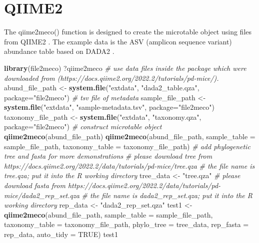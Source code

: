 \documentclass[
]{book}
\newenvironment{Shaded}{\begin{snugshade}}{\end{snugshade}}
\newcommand{\AttributeTok}[1]{\textcolor[rgb]{0.13,0.29,0.53}{#1}}
\newcommand{\CommentTok}[1]{\textcolor[rgb]{0.56,0.35,0.01}{\textit{#1}}}
\newcommand{\ConstantTok}[1]{\textcolor[rgb]{0.56,0.35,0.01}{#1}}
\newcommand{\FunctionTok}[1]{\textcolor[rgb]{0.13,0.29,0.53}{\textbf{#1}}}
\newcommand{\NormalTok}[1]{#1}
\newcommand{\OtherTok}[1]{\textcolor[rgb]{0.56,0.35,0.01}{#1}}
\newcommand{\StringTok}[1]{\textcolor[rgb]{0.31,0.60,0.02}{#1}}
\begin{document}
\section{QIIME2}\label{qiime2}

The qiime2meco() function is designed to create the microtable object using files from QIIME2 \citep{Bolyen_Reproducible_2019}.
The example data is the ASV (amplicon sequence variant) abundance table based on DADA2 \citep{Callahan_DADA2_2016}.

\begin{Shaded}
\begin{Highlighting}[]
\FunctionTok{library}\NormalTok{(file2meco)}
\NormalTok{?qiime2meco}
\CommentTok{\# use data files inside the package which were downloaded from (https://docs.qiime2.org/2022.2/tutorials/pd{-}mice/).}
\NormalTok{abund\_file\_path }\OtherTok{\textless{}{-}} \FunctionTok{system.file}\NormalTok{(}\StringTok{"extdata"}\NormalTok{, }\StringTok{"dada2\_table.qza"}\NormalTok{, }\AttributeTok{package=}\StringTok{"file2meco"}\NormalTok{)}
\CommentTok{\# tsv file of metadata}
\NormalTok{sample\_file\_path }\OtherTok{\textless{}{-}} \FunctionTok{system.file}\NormalTok{(}\StringTok{"extdata"}\NormalTok{, }\StringTok{"sample{-}metadata.tsv"}\NormalTok{, }\AttributeTok{package=}\StringTok{"file2meco"}\NormalTok{)}
\NormalTok{taxonomy\_file\_path }\OtherTok{\textless{}{-}} \FunctionTok{system.file}\NormalTok{(}\StringTok{"extdata"}\NormalTok{, }\StringTok{"taxonomy.qza"}\NormalTok{, }\AttributeTok{package=}\StringTok{"file2meco"}\NormalTok{)}
\CommentTok{\# construct microtable object}
\FunctionTok{qiime2meco}\NormalTok{(abund\_file\_path)}
\FunctionTok{qiime2meco}\NormalTok{(abund\_file\_path, }\AttributeTok{sample\_table =}\NormalTok{ sample\_file\_path, }\AttributeTok{taxonomy\_table =}\NormalTok{ taxonomy\_file\_path)}
\CommentTok{\# add phylogenetic tree and fasta for more demonstrations}
\CommentTok{\# please download tree from https://docs.qiime2.org/2022.2/data/tutorials/pd{-}mice/tree.qza}
\CommentTok{\# the file name is \textquotesingle{}tree.qza\textquotesingle{}; put it into the R working directory}
\NormalTok{tree\_data }\OtherTok{\textless{}{-}} \StringTok{"tree.qza"}
\CommentTok{\# please download fasta from https://docs.qiime2.org/2022.2/data/tutorials/pd{-}mice/dada2\_rep\_set.qza}
\CommentTok{\# the file name is \textquotesingle{}dada2\_rep\_set.qza\textquotesingle{}; put it into the R working directory}
\NormalTok{rep\_data }\OtherTok{\textless{}{-}} \StringTok{"dada2\_rep\_set.qza"}
\NormalTok{test1 }\OtherTok{\textless{}{-}} \FunctionTok{qiime2meco}\NormalTok{(abund\_file\_path, }\AttributeTok{sample\_table =}\NormalTok{ sample\_file\_path, }\AttributeTok{taxonomy\_table =}\NormalTok{ taxonomy\_file\_path, }\AttributeTok{phylo\_tree =}\NormalTok{ tree\_data, }\AttributeTok{rep\_fasta =}\NormalTok{ rep\_data, }\AttributeTok{auto\_tidy =} \ConstantTok{TRUE}\NormalTok{)}
\NormalTok{test1}
\end{Highlighting}
\end{Shaded}
\end{document}
